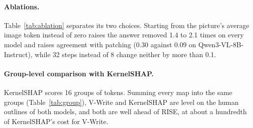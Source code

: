 \paragraph{Ablations.} Table~\ref{tab:ablation} separates its two choices. Starting from the picture's average image token instead of zero raises the answer removed 1.4 to 2.1 times on every model and raises agreement with patching (0.30 against 0.09 on Qwen3-VL-8B-Instruct), while 32 steps instead of 8 change neither by more than 0.1.

\begin{table}[!htbp]
  \centering
\footnotesize \setlength{\tabcolsep}{4pt}
\caption{Integration start point and number of steps. Integrated gradients over image-token states at half depth, SimonSays, the same records per model: from the picture's mean image-token state with 8 steps (V-Write) or 32 steps, and from a zero state with 64 steps (the usual choice). Answer removed: fall in the answer margin with the top 20\% of tokens set to zero. Agreement: rank correlation with the measured effect of zeroing each of 16 regions. 95\% bootstrap intervals over records.}
  \label{tab:ablation}
\end{table}

\paragraph{Group-level comparison with KernelSHAP.} KernelSHAP scores 16 groups of tokens. Summing every map into the same groups (Table~\ref{tab:group}), V-Write and KernelSHAP are level on the human outlines of both models, and both are well ahead of RISE, at about a hundredth of KernelSHAP's cost for V-Write.


